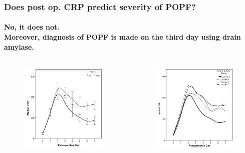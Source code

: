 \documentclass[10pt]{beamer}
\begin{document}
\begin{frame}
	\frametitle{Does post op. CRP predict severity of POPF?}
	\framesubtitle{No, it does not. \\ Moreover, diagnosis of POPF is made on the third day using drain amylase. }
	
	\begin{columns}
			\begin{figure}
				\includegraphics[width=\textwidth]{../Figures/crp_comp_crp_popf_yes_no}
			\end{figure}
		
			\begin{figure}
				\includegraphics[width=\textwidth]{../Figures/crp_comp_crp_popf_isgps}
			\end{figure}
	\end{columns}


\end{frame}
\end{document}
